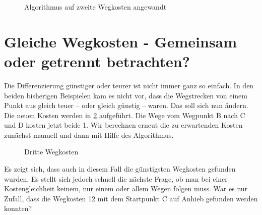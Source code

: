 \begin{figure}[H]
	\centering
	\caption{Algorithmus auf zweite Wegkosten angewandt
		\label{fig:zweite-algorithmus}}
\end{figure}


\section{Gleiche Wegkosten - Gemeinsam oder getrennt betrachten?}
\label{sec:gleiche-wegkosten}
Die Differenzierung \glqq{}günstiger\grqq{} oder \glqq{}teurer\grqq{} ist nicht immer ganz so einfach. In den beiden bisherigen Beispielen kam es nicht vor, dass die Wegstrecken von einem Punkt aus gleich teuer -- oder gleich günstig -- waren. Das soll sich nun ändern. Die neuen Kosten werden in \cref{fig:dritte-wegkosten} aufgeführt. Die Wege vom Wegpunkt B nach C und D kosten jetzt beide 1.
Wir berechnen erneut die zu erwartenden Kosten zunächst manuell und dann mit Hilfe des Algorithmus.

\begin{figure}[H]
	\centering
	\caption{Dritte Wegkosten
		\label{fig:dritte-wegkosten}}
\end{figure}

Es zeigt sich, dass auch in diesem Fall die günstigsten Wegkosten gefunden wurden. Es stellt sich jedoch schnell die nächste Frage, ob man bei einer Kostengleichheit keinem, nur einem oder allem Wegen folgen muss. War es nur Zufall, dass die Wegkosten 12 mit dem Startpunkt C auf Anhieb gefunden werden konnten?

